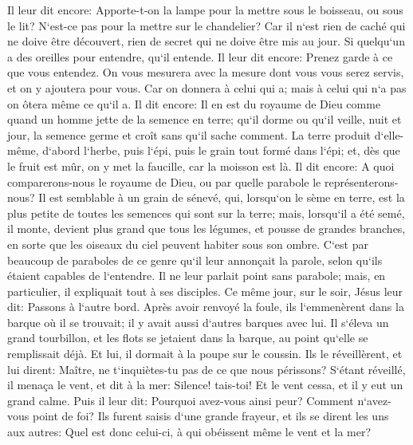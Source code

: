 \verse Il leur dit encore: Apporte-t-on la lampe pour la mettre sous le boisseau, ou sous le lit? N`est-ce pas pour la mettre sur le chandelier? 
\verse Car il n`est rien de caché qui ne doive être découvert, rien de secret qui ne doive être mis au jour. 
\verse Si quelqu`un a des oreilles pour entendre, qu`il entende. 
\verse Il leur dit encore: Prenez garde à ce que vous entendez. On vous mesurera avec la mesure dont vous vous serez servis, et on y ajoutera pour vous. 
\verse Car on donnera à celui qui a; mais à celui qui n`a pas on ôtera même ce qu`il a. 
\verse Il dit encore: Il en est du royaume de Dieu comme quand un homme jette de la semence en terre; 
\verse qu`il dorme ou qu`il veille, nuit et jour, la semence germe et croît sans qu`il sache comment. 
\verse La terre produit d`elle-même, d`abord l`herbe, puis l`épi, puis le grain tout formé dans l`épi; 
\verse et, dès que le fruit est mûr, on y met la faucille, car la moisson est là. 
\verse Il dit encore: A quoi comparerons-nous le royaume de Dieu, ou par quelle parabole le représenterons-nous? 
\verse Il est semblable à un grain de sénevé, qui, lorsqu`on le sème en terre, est la plus petite de toutes les semences qui sont sur la terre; 
\verse mais, lorsqu`il a été semé, il monte, devient plus grand que tous les légumes, et pousse de grandes branches, en sorte que les oiseaux du ciel peuvent habiter sous son ombre. 
\verse C`est par beaucoup de paraboles de ce genre qu`il leur annonçait la parole, selon qu`ils étaient capables de l`entendre. 
\verse Il ne leur parlait point sans parabole; mais, en particulier, il expliquait tout à ses disciples. 
\verse Ce même jour, sur le soir, Jésus leur dit: Passons à l`autre bord. 
\verse Après avoir renvoyé la foule, ils l`emmenèrent dans la barque où il se trouvait; il y avait aussi d`autres barques avec lui. 
\verse Il s`éleva un grand tourbillon, et les flots se jetaient dans la barque, au point qu`elle se remplissait déjà. 
\verse Et lui, il dormait à la poupe sur le coussin. Ils le réveillèrent, et lui dirent: Maître, ne t`inquiètes-tu pas de ce que nous périssons? 
\verse S`étant réveillé, il menaça le vent, et dit à la mer: Silence! tais-toi! Et le vent cessa, et il y eut un grand calme. 
\verse Puis il leur dit: Pourquoi avez-vous ainsi peur? Comment n`avez-vous point de foi? 
\verse Ils furent saisis d`une grande frayeur, et ils se dirent les uns aux autres: Quel est donc celui-ci, à qui obéissent même le vent et la mer? 

